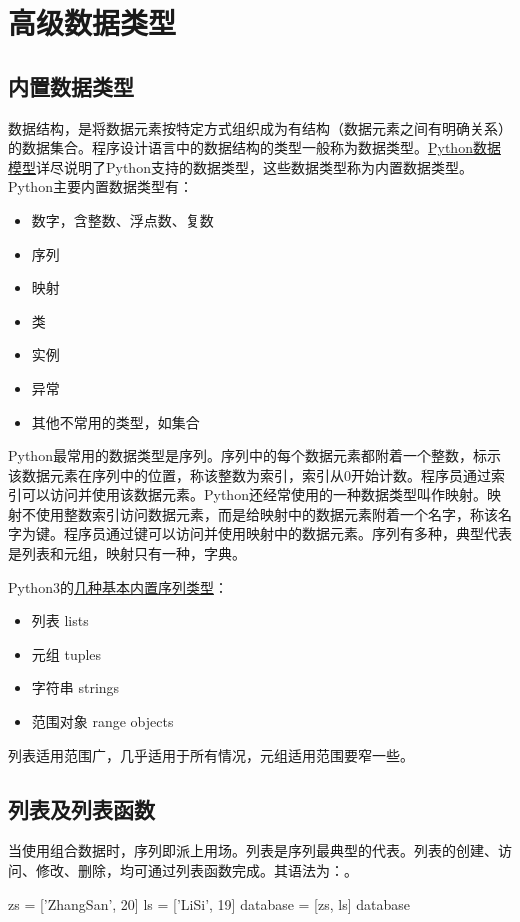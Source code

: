 \chapter{高级数据类型}

\section{内置数据类型}
数据结构，是将数据元素按特定方式组织成为有结构（数据元素之间有明确关系）的数据集合。程序设计语言中的数据结构的类型一般称为数据类型。\href{https://docs.python.org/3/reference/datamodel.html}{Python数据模型}详尽说明了Python支持的数据类型，这些数据类型称为内置数据类型。
Python主要内置数据类型有：
\begin{itemize}
\item 数字，含整数、浮点数、复数
\item 序列
\item 映射
\item 类
\item 实例
\item 异常
\item 其他不常用的类型，如集合
\end{itemize}

Python最常用的数据类型是序列。序列中的每个数据元素都附着一个整数，标示该数据元素在序列中的位置，称该整数为索引，索引从0开始计数。程序员通过索引可以访问并使用该数据元素。Python还经常使用的一种数据类型叫作映射。映射不使用整数索引访问数据元素，而是给映射中的数据元素附着一个名字，称该名字为键。程序员通过键可以访问并使用映射中的数据元素。序列有多种，典型代表是列表和元组，映射只有一种，字典。

Python3的\href{https://docs.python.org/3/library/stdtypes.html#sequence-types-list-tuple-range}{几种基本内置序列类型}：
\begin{itemize}
\item 列表 lists
\item 元组 tuples
\item 字符串 strings
\item 范围对象 range objects
\end{itemize}
列表适用范围广，几乎适用于所有情况，元组适用范围要窄一些。

\section{列表及列表函数}
当使用组合数据时，序列即派上用场。列表是序列最典型的代表。列表的创建、访问、修改、删除，均可通过列表函数完成。其语法为：。
\begin{python}
zs = ['ZhangSan', 20]
ls = ['LiSi', 19]
database = [zs, ls]
database
\end{python}
